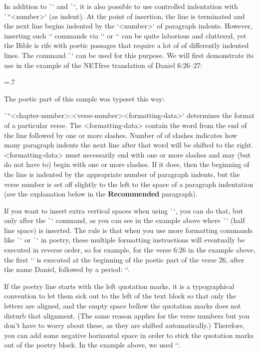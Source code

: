 In addition to \`\begcenter` and \`\endcenter`, it is also possible to use controlled 
indentation with \`\ind``<number>` (as indent). 
At the point of insertion, the line is terminated and the next line begins indented by the
`<number>` of paragraph indents. However, inserting such `\ind` commands
via `\fmtins` or `\fmtpre` can be quite laborious and
cluttered, yet the Bible is rife with poetic passages that require a lot of
of differently indented lines. The command \`\fmtpoetry` can be used for this purpose.
We will first demonstrate its use in the example of the NETfree translation of 
Daniel 6:26--27:

\medskip
\centerline{\picw=.7\hsize{} }
\vskip-2pt %


The poetic part of this sample was typeset this way:
\begtt
{}
\endtt

\`\fmtpoetry``{<chapter-number>:<verse-number>}{<formatting-data>}` determines the 
format of a particular verse. The <formatting-data>
contain the word from the end of the line followed by one or more slashes. Number of
of slashes indicates how many paragraph indents the next line after 
that word will be shifted to the right. <formatting-data> must necessarily end with one or more
slashes and may (but do not have to) begin with one or more slashes.  If
it does, then the beginning of the line is indented by the appropriate number of paragraph indents,
but the verse number is set off slightly to the left to the space of a paragraph
indentation (see the explanation below in the {\bf Recommended} paragraph).

If you want to insert extra vertical spaces when using \`\fmtpoetry`, 
you can do that, but only after the \`\fmtpoetry` command, as you can  see in the example above where
\`\medskip` (half line space) is inserted. 
The rule is that when you use more formatting commands like \`\fmtins` or \`\fmtpre` in poetry, 
these multiple formatting instructions will eventually be executed
in reverse order, so for example, for the verse 6:26 in the  example above, 
the first `\medskip` is executed at the beginning of the poetic part of the verse 
26, after the name Daniel, followed by a period: ``.

\recommended
If the poetry line starts with the left quotation marks, it is a typographical convention to let 
them sick out to the left of the text block so that only the letters are aligned, and the empty 
space bellow the quotation marks does not disturb that alignment. (The same reason applies for the verse numbers but you don't have to 
worry about these, as they are shifted automatically.)
Therefore, you can add some negative horizontal space in order to stick the quotation marks out of 
the poetry block. In the example above, we used `\hglue-2mm`. 


